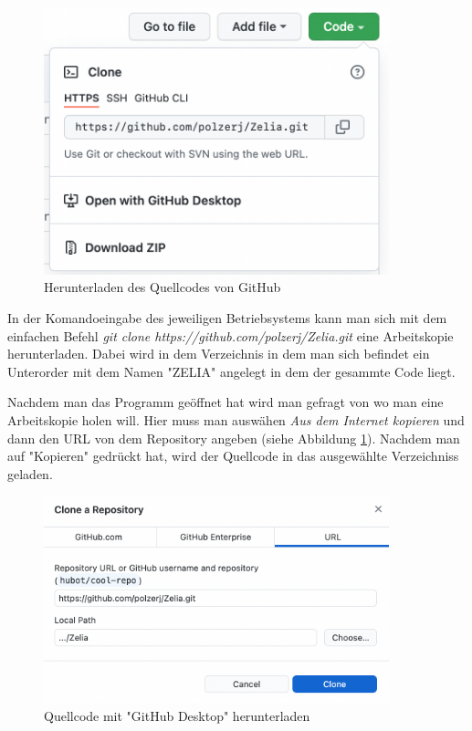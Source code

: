 \begin{figure}[H]
    \centering
    \includegraphics[width=100mm]{media/Handbuch/GitHub_Download.png}
    \caption{Herunterladen des Quellcodes von GitHub}
\end{figure}


In der Komandoeingabe des jeweiligen Betriebsystems kann man sich mit dem einfachen Befehl \emph{git clone https://github.com/polzerj/Zelia.git} eine Arbeitskopie herunterladen. Dabei wird in dem Verzeichnis in dem man sich befindet ein Unterorder mit dem Namen "ZELIA" angelegt in dem der gesammte Code liegt.


Nachdem man das Programm geöffnet hat wird man gefragt von wo man eine Arbeitskopie holen will. Hier muss man auswähen \emph{Aus dem Internet kopieren} und dann den URL von dem Repository angeben (siehe Abbildung \ref{fig:clonewithdesktop}). Nachdem man auf "Kopieren" gedrückt hat, wird der Quellcode in das ausgewählte Verzeichniss geladen. 

\begin{figure}[H]
    \centering
    \includegraphics[width=100mm]{media/Handbuch/clone_gh.png}
    \caption{Quellcode mit "GitHub Desktop" herunterladen}
    \label{fig:clonewithdesktop}
\end{figure}

